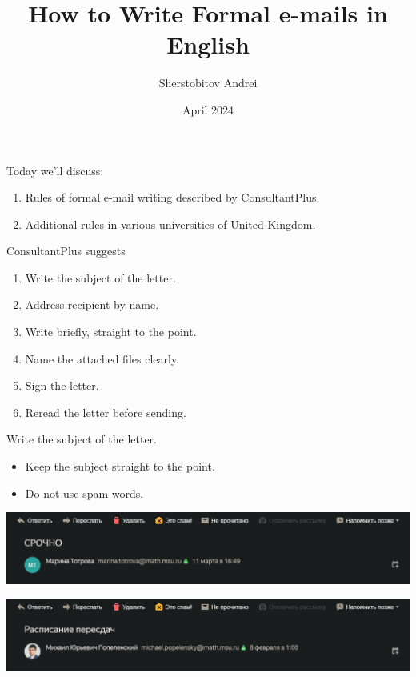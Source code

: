 \documentclass{beamer}
\title{How to Write Formal e-mails in English}
\author{Sherstobitov Andrei}
\date{April 2024}
\begin{document}
\begin{frame}
  \titlepage
\end{frame}

\begin{frame}{Today we'll discuss:}
  \begin{enumerate}
    \item Rules of formal e-mail writing described by ConsultantPlus.
    \item Additional rules in various universities of United Kingdom.
  \end{enumerate}
\end{frame}

\begin{frame}{ConsultantPlus \cite{ConsultantPlus} suggests}
  \begin{enumerate}
    \item Write the subject of the letter.
    \item Address recipient by name.
    \item Write briefly, straight to the point.
    \item Name the attached files clearly.
    \item Sign the letter.
    \item Reread the letter before sending.
  \end{enumerate}
\end{frame}

\begin{frame}{Write the subject of the letter.}
  \begin{itemize}
    \item Keep the subject straight to the point.
    \item Do not use spam words.
  \end{itemize}

  \includegraphics[width=\linewidth]{theme-bad.png}

  \includegraphics[width=\linewidth]{theme-good.png}

\end{frame}
\end{document}
